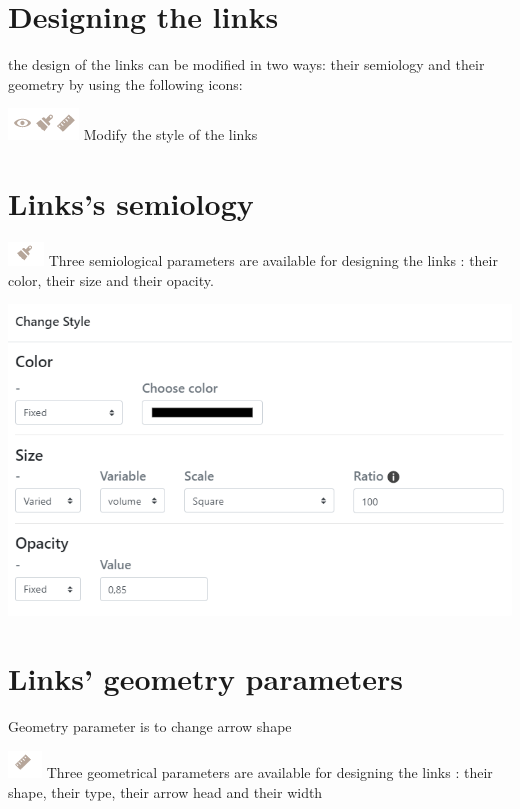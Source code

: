 \documentclass[
  letterpaper,
  DIV=11,
  numbers=noendperiod]{scrreprt}
\begin{document}
\section{Designing the links}\label{designing-the-links}

the design of the links can be modified in two ways: their semiology and
their geometry by using the following icons:

\includegraphics{./images/Icon_links_geom.png} Modify the style of the
links

\section{Links's semiology}\label{linkss-semiology}

\includegraphics{images/Buton_action_semio.png} Three semiological
parameters are available for designing the links : their color, their
size and their opacity.

\includegraphics{./images/Links_change_style.png}

\section{Links' geometry parameters}\label{links-geometry-parameters}

Geometry parameter is to change arrow shape

\includegraphics{images/Buton_action_geom.png} Three geometrical
parameters are available for designing the links : their shape, their
type, their arrow head and their width
\end{document}
